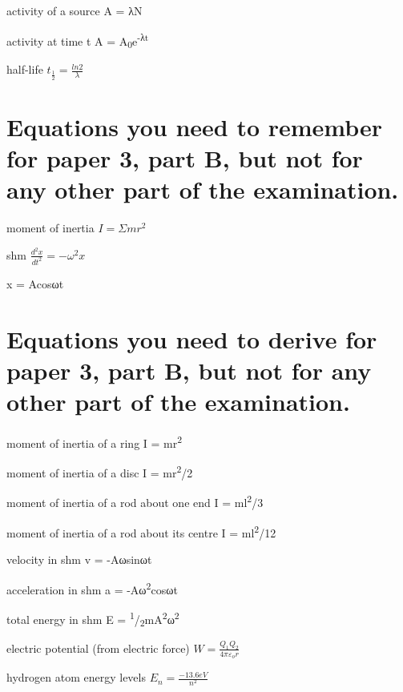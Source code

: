 \documentclass[main.tex]{subfiles}
\begin{document}
activity of a source A = λN

activity at time t A = A­­\textsubscript{0}e\textsuperscript{-λt}

half-life \(t_{\frac{1}{2}} = \frac{ln2}{\lambda}\)

\section{Equations you need to remember for paper 3, part B, but not for any
other part of the examination.}

moment of inertia \(I = \Sigma mr^{2}\)

shm \(\frac{d^{2}x}{dt^{2}} = - \omega^{2}x\)

x = Acosωt

\section{Equations you need to derive for paper 3, part B, but not for any other
part of the examination.}

moment of inertia of a ring I = mr\textsuperscript{2}

moment of inertia of a disc I = mr\textsuperscript{2}/2

moment of inertia of a rod about one end I = ml\textsuperscript{2}/3

moment of inertia of a rod about its centre I = ml\textsuperscript{2}/12

velocity in shm v = -Aωsinωt

acceleration in shm a = -Aω\textsuperscript{2}cosωt

total energy in shm E =
\textsuperscript{1}/\textsubscript{2}mA\textsuperscript{2}ω\textsuperscript{2}

electric potential (from electric force)
\(W = \frac{Q_{1}Q_{2}}{4\pi\varepsilon_{o}r}\)

hydrogen atom energy levels \(E_{n} = \frac{- 13.6eV}{n^{2}}\)
\end{document}
